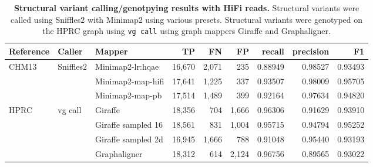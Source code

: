 \documentclass[11pt]{ucscthesis}
\begin{document}
\begin{landscape}
\begin{table}[htb]
    \centering
    \begin{tabular}{|l|l|l|r|r|r|r|r|r|}
        \hline
        Reference       & Caller        & Mapper                & TP           & FN          & FP       & recall       & precision       & F1 \\
        \hline
        CHM13           & Sniffles2     & Minimap2-lr:hqae      & 16,670       & 2,071       & 235      & 0.88949      & 0.98527       & 0.93493 \\
                        &               & Minimap2-map-hifi     & 17,641       & 1,225       & 337      & 0.93507      & 0.98009       & 0.95705 \\
                        &               & Minimap2-map-pb       & 17,514       & 1,489       & 399      & 0.92164      & 0.97634       & 0.94820 \\
        HPRC            & vg call       & Giraffe              & 18,356       & 704         & 1,666    & 0.96306      & 0.91629       & 0.93910 \\
                        &               & Giraffe sampled 16   & 18,561       & 831         & 1,004    & 0.95715      & 0.94794       & 0.95252 \\
                        &               & Giraffe sampled 2d   & 16,945       & 1,666       & 788      & 0.91048      & 0.95440       & 0.93193 \\
                        &               & Graphaligner         & 18,312       & 614         & 2,124    & 0.96756      & 0.89565       & 0.93022 \\
        \hline
    \end{tabular}
    \caption[SV HiFi results]{\textbf{Structural variant calling/genotpying results with HiFi reads.} Structural variants were called using Sniffles2 with Minimap2 using various presets. Structural variants were genotyped on the HPRC graph using \texttt{vg call} using graph mappers Giraffe and Graphaligner. }
    \label{tab:sv_hifi}
\end{table}


\end{landscape}
\end{document}
